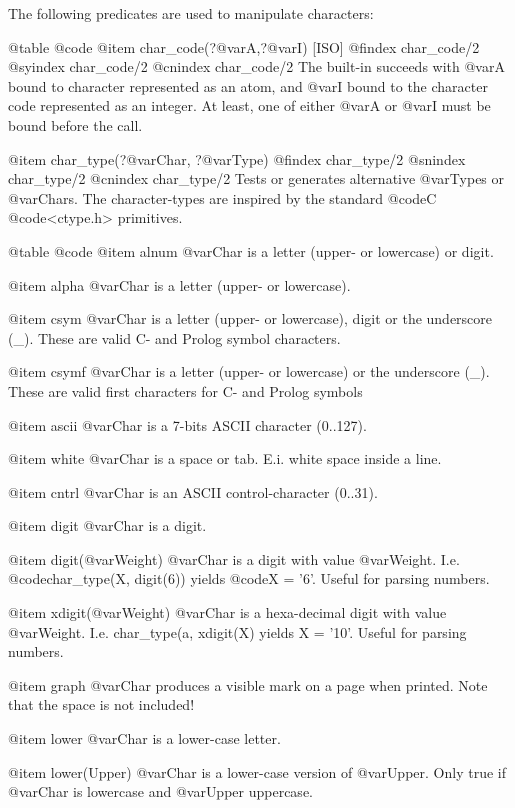 {{{{The following predicates are used to manipulate characters:

@table @code
@item char_code(?@var{A},?@var{I}) [ISO]
@findex char_code/2
@syindex char_code/2
@cnindex char_code/2
The built-in succeeds with @var{A} bound to character represented as an
atom, and @var{I} bound to the character code represented as an
integer. At least, one of either @var{A} or @var{I} must be bound before
the call.

@item char_type(?@var{Char}, ?@var{Type})
@findex char_type/2
@snindex char_type/2
@cnindex char_type/2
    Tests or generates alternative @var{Types} or @var{Chars}. The
    character-types are inspired by the standard @code{C}
    @code{<ctype.h>} primitives.

@table @code
@item    alnum
        @var{Char} is a letter (upper- or lowercase) or digit.

@item    alpha
        @var{Char} is a letter (upper- or lowercase).

@item    csym
        @var{Char} is a letter (upper- or lowercase), digit or the underscore (_). These are valid C- and Prolog symbol characters.

@item    csymf
        @var{Char} is a letter (upper- or lowercase) or the underscore (_). These are valid first characters for C- and Prolog symbols

@item    ascii
        @var{Char} is a 7-bits ASCII character (0..127).

@item    white
        @var{Char} is a space or tab. E.i. white space inside a line.

@item    cntrl
        @var{Char} is an ASCII control-character (0..31).

@item    digit
        @var{Char} is a digit.

@item    digit(@var{Weight})
        @var{Char} is a digit with value
        @var{Weight}. I.e. @code{char_type(X, digit(6))} yields @code{X =
        '6'}. Useful for parsing numbers.

@item    xdigit(@var{Weight})
        @var{Char} is a hexa-decimal digit with value @var{Weight}. I.e. char_type(a, xdigit(X) yields X = '10'. Useful for parsing numbers.

@item    graph
        @var{Char} produces a visible mark on a page when printed. Note that the space is not included!

@item    lower
        @var{Char} is a lower-case letter.

@item    lower(Upper)
        @var{Char} is a lower-case version of @var{Upper}. Only true if
        @var{Char} is lowercase and @var{Upper} uppercase.

}}}}
